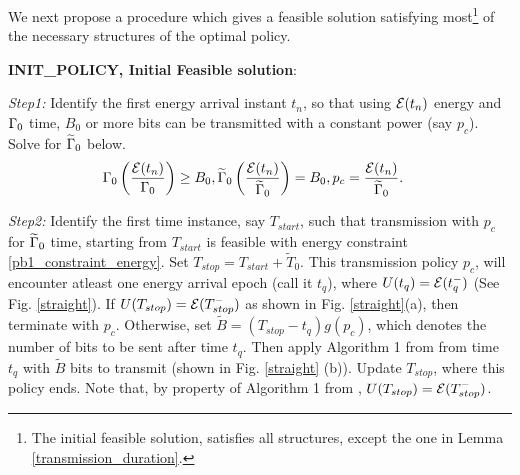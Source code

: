 
%

We next propose a procedure which gives a feasible solution satisfying most\footnote{The initial feasible solution, satisfies all structures, except the one in Lemma \ref{transmission_duration}.} of the necessary structures of the optimal policy.

\textbf{INIT\_POLICY, Initial Feasible solution}:

\textit{Step1:} Identify the first energy arrival instant $t_n$, so that using $\mathcal{E}(t_n)$ energy and $\Gamma_0$ time, $B_0$ or more bits can be transmitted with a constant power (say $p_c$). Solve for $\widetilde{\Gamma}_0$ below.
\begin{align}
&\TRx_0\left(\dfrac{\ETx(t_n)}{\TRx_0}\right)\ge B_0, \widetilde{\TRx}_0\left(\dfrac{\ETx(t_n)}{\widetilde{\TRx}_0}\right)= B_0, p_c = \dfrac{\ETx({t_n})}{\widetilde{\TRx}_0}.
\label{INIT_POLICY_time}
\end{align}
 
\textit{Step2:} Identify the first time instance, say $T_{start}$, such that transmission with $p_c$ for $\widetilde{\Gamma}_0$ time, starting from $T_{start}$ is feasible with energy constraint \eqref{pb1_constraint_energy}. Set $T_{stop} = T_{start} + \widetilde{T}_0$. This transmission policy $p_c$, will encounter atleast one energy arrival epoch (call it $t_q$), where $U(t_q) = \mathcal{E}(t_q^-)$ (See Fig. \ref{straight}). If $U(T_{stop}) = \mathcal{E}(T_{stop}^-)$ as shown in Fig. \ref{straight}(a), then terminate with $p_c$. Otherwise, set $\widetilde{B} = (T_{stop} - t_q)g(p_c)$, which denotes the number of bits to be sent after time $t_q$. Then apply Algorithm 1 from \cite{Yang} from time $t_q$ with $\widetilde{B}$ bits to transmit (shown in Fig. \ref{straight} (b)). Update $T_{stop}$, where this policy ends. Note that, by property of Algorithm 1 from \cite{Yang}, $U(T_{stop}) = \mathcal{E}(T_{stop}^-)$.

